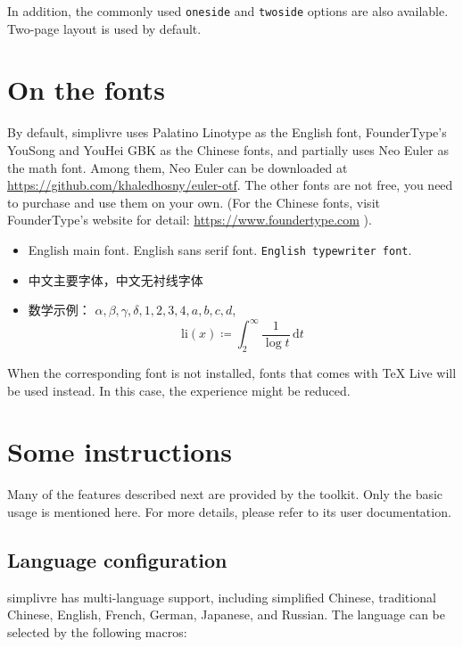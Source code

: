 \documentclass{simplivre}
\newenvironment{remind}[1][Remind]{%
    \LocallyStopLineNumbers%
    \begin{tcolorbox}[breakable,
        enhanced,
        width = \textwidth,
        colback = white, colbacktitle = paper,
        colframe = gray!50, boxrule=0.2mm,
        coltitle = black,
        fonttitle = \sffamily,
        attach boxed title to top left = {yshift=-\tcboxedtitleheight/2,  xshift=\tcboxedtitlewidth/4},
        boxed title style = {boxrule=0pt, colframe=paper},
        before skip = 0.3cm,
        after skip = 0.3cm,
        top = 3mm,
        bottom = 3mm,
        title={\sffamily #1}]%
}{\end{tcolorbox}\ResumeLineNumbers}
\providecommand{\simplivre}{\textsf{simplivre}}
\begin{document}
\bigskip
In addition, the commonly used \texttt{oneside} and \texttt{twoside} options are also available. Two-page layout is used by default.

\chapter{On the fonts}
By default, \simplivre{} uses Palatino Linotype as the English font, FounderType's YouSong and YouHei GBK as the Chinese fonts, and partially uses Neo Euler as the math font. Among them, Neo Euler can be downloaded at \url{https://github.com/khaledhosny/euler-otf}. The other fonts are not free, you need to purchase and use them on your own. (For the Chinese fonts, visit FounderType's website for detail: \url{https://www.foundertype.com} ).

\begin{remind}[Font demonstration]
    \begin{itemize}
        \item English main font. \textsf{English sans serif font}. \texttt{English typewriter font}.
        \item 中文主要字体，\textsf{中文无衬线字体}
        \item 数学示例： \( \alpha, \beta, \gamma, \delta, 1,2,3,4, a,b,c,d \), \[\mathrm{li}(x)\coloneqq \int_2^{\infty} \frac{1}{\log t}\,\mathrm{d}t \]
    \end{itemize}
\end{remind}

\bigskip
When the corresponding font is not installed, fonts that comes with TeX Live will be used instead. In this case, the experience might be reduced.


\chapter{Some instructions}

\vspace{-\baselineskip}
Many of the features described next are provided by the \ProjLib{} toolkit. Only the basic usage is mentioned here. For more details, please refer to its user documentation.

\section{Language configuration}

\simplivre{} has multi-language support, including simplified Chinese, traditional Chinese, English, French, German, Japanese, and Russian. The language can be selected by the following macros:
\end{document}
